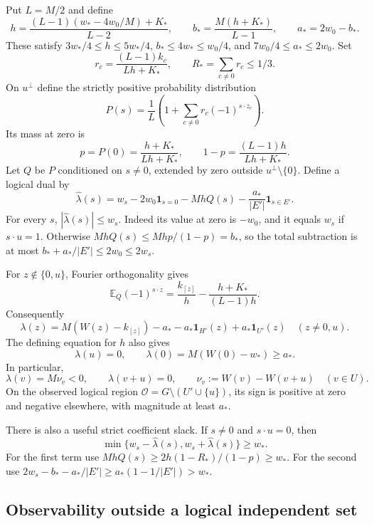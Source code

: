 Put $L=M/2$ and define
\[
 h=\frac{(L-1)(w_*-4w_0/M)+K_*}{L-2},\qquad
 b_* =\frac{M(h+K_*)}{L-1},\qquad a_*=2w_0-b_*.
\]
These satisfy $3w_*/4\le h\le5w_*/4$, $b_*\le4w_*\le w_0/4$,
and $7w_0/4\le a_*\le2w_0$. Set
\[
 r_c=\frac{(L-1)k_c}{Lh+K_*},\qquad R_*=\sum_{c\ne0}r_c\le1/3.
\]
On $u^\perp$ define the strictly positive probability distribution
\[
 P(s)=\frac1L\left(1+\sum_{c\ne0}r_c(-1)^{s\cdot z_c}\right).
\]
Its mass at zero is
\[
 p=P(0)=\frac{h+K_*}{Lh+K_*},\qquad
 1-p=\frac{(L-1)h}{Lh+K_*}.
\]
Let $Q$ be $P$ conditioned on $s\ne0$, extended by zero outside
$u^\perp\setminus\{0\}$. Define a logical dual by
\begin{equation}\label{eq:rect-dual}
 \widehat\lambda(s)=w_s-2w_0\mathbf1_{s=0}
                    -MhQ(s)-\frac{a_*}{|E'|}\mathbf1_{s\in E'}.
\end{equation}
For every $s$, $|\widehat\lambda(s)|\le w_s$. Indeed its value at zero
is $-w_0$, and it equals $w_s$ if $s\cdot u=1$. Otherwise
$MhQ(s)\le Mh p/(1-p)=b_*$, so the total subtraction is at most
$b_*+a_*/|E'|\le2w_0\le2w_s$.

For $z\notin\{0,u\}$, Fourier orthogonality gives
\[
 \mathbb E_Q(-1)^{s\cdot z}
 =\frac{k_{[z]}}h-\frac{h+K_*}{(L-1)h}.
\]
Consequently
\begin{equation}\label{eq:rect-dual-values}
 \lambda(z)=M(W(z)-k_{[z]})-a_*
            -a_*\mathbf1_{H'}(z)+a_*\mathbf1_{U'}(z)
 \quad(z\ne0,u).
\end{equation}
The defining equation for $h$ also gives
\[
 \lambda(u)=0,\qquad \lambda(0)=M(W(0)-w_*)\ge a_*.
\]
In particular,
\[
 \lambda(v)=M\nu_v<0,\qquad \lambda(v+u)=0,
 \qquad \nu_v:=W(v)-W(v+u)\quad(v\in U).
\]
On the observed logical region
$\mathcal O=G\setminus(U'\cup\{u\})$, its sign is positive at zero
and negative elsewhere, with magnitude at least $a_*$.

There is also a useful strict coefficient slack. If $s\ne0$ and
$s\cdot u=0$, then
\begin{equation}\label{eq:rect-invariant-slack}
 \min\{w_s-\widehat\lambda(s),w_s+\widehat\lambda(s)\}\ge w_*.
\end{equation}
For the first term use
$MhQ(s)\ge2h(1-R_*)/(1-p)\ge w_*$.
For the second use
$2w_s-b_*-a_*/|E'|\ge a_*(1-1/|E'|)>w_*$.

\subsection{Observability outside a logical independent set}


